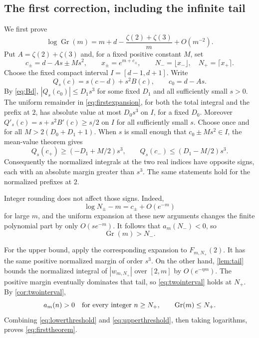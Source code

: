 \documentclass[11pt]{article}
\numberwithin{equation}{section}
\theoremstyle{definition}
\newcommand{\Gr}{\operatorname{Gr}}
\begin{document}
\subsection{The first correction, including the infinite tail}
We first prove
\begin{equation}\label{eq:firsttheorem}
 \log\Gr(m)=m+d-\frac{\zeta(2)+\zeta(3)}{m}+O(m^{-2}).
\end{equation}
Put $A=\zeta(2)+\zeta(3)$ and, for a fixed positive constant $M$, set
\[
 c_\pm=d-As\pm Ms^2,\qquad
 x_\pm=e^{m+c_\pm},\qquad
 N_- =\lfloor x_-\rfloor,\quad N_+=\lceil x_+\rceil.
\]
Choose the fixed compact interval $I=[d-1,d+1]$. Write
\[
 Q_s(c)=s(c-d)+s^2B(c),\qquad c_0=d-As.
\]
By \eqref{eq:Bd}, $|Q_s(c_0)|\le D_1s^3$ for some fixed $D_1$ and
all sufficiently small $s>0$. The uniform remainder in
\eqref{eq:firstexpansion}, for both the total integral and the prefix at
$2$, has absolute value at most $D_0s^3$ on $I$, for a fixed $D_0$.
Moreover $Q'_s(c)=s+s^2B'(c)\ge s/2$ on $I$ for all sufficiently small
$s$. Choose once and for all $M>2(D_0+D_1+1)$. When $s$ is small enough
that $c_0\pm Ms^2\in I$, the mean-value theorem gives
\[
 Q_s(c_+)\ge(-D_1+M/2)s^3,\qquad
 Q_s(c_-)\le(D_1-M/2)s^3.
\]
Consequently the normalized integrals at the two real indices have
opposite signs, each with an absolute margin greater than $s^3$.
The same statements hold for the normalized prefixes at $2$.

Integer rounding does not affect those signs. Indeed,
\[
 \log N_\pm-m=c_\pm+O(e^{-m})
\]
for large $m$, and the uniform expansion at these new arguments changes
the finite polynomial part by only $O(se^{-m})$. It follows that
$a_m(N_-)<0$, so
\begin{equation}\label{eq:lowerthreshold}
 \Gr(m)>N_-.
\end{equation}

For the upper bound, apply the corresponding expansion to
$F_{m,N_+}(2)$. It has the same positive normalized margin of order $s^3$.
On the other hand, \cref{lem:tail} bounds the normalized integral of
$|w_{m,N_+}|$ over $[2,m]$ by $O(e^{-\eta m})$. The positive margin
eventually dominates that tail, so \eqref{eq:twointerval} holds at $N_+$.
By \cref{cor:twointerval},
\begin{equation}\label{eq:upperthreshold}
 a_m(n)>0\quad\hbox{for every integer }n\ge N_+,
 \qquad\Gr(m)\le N_+.
\end{equation}
Combining \eqref{eq:lowerthreshold} and \eqref{eq:upperthreshold}, then
taking logarithms, proves \eqref{eq:firsttheorem}.
\end{document}
